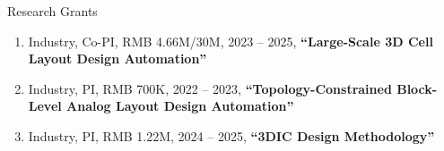 \begin{rSection}{Research Grants}
\begin{enumerate}[font=\normalfont]
\item Industry, Co-PI, RMB 4.66M/30M, 2023 -- 2025, \textbf{``Large-Scale 3D Cell Layout Design Automation''}

\item Industry, PI, RMB 700K, 2022 -- 2023, \textbf{``Topology-Constrained Block-Level Analog Layout Design Automation''}

\item Industry, PI, RMB 1.22M, 2024 -- 2025, \textbf{``3DIC Design Methodology''}

\end{enumerate}

\end{rSection}
